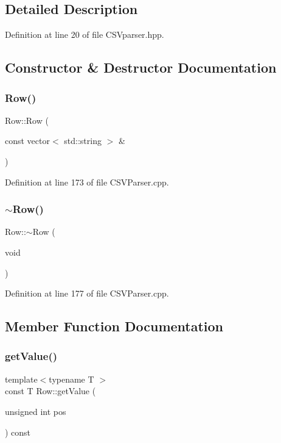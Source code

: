\subsection{Detailed Description}


Definition at line 20 of file C\+S\+Vparser.\+hpp.



\subsection{Constructor \& Destructor Documentation}
\mbox{\label{class_row_a86c5a552052b35938a825ff0d0b66c70}} 
\subsubsection{Row()}
{\footnotesize\ttfamily Row\+::\+Row (\begin{DoxyParamCaption}\item[{const vector$<$ std\+::string $>$ \&}]{ }\end{DoxyParamCaption})}



Definition at line 173 of file C\+S\+V\+Parser.\+cpp.

\mbox{\label{class_row_a671be9f718722eccb2d3121f1579733e}} 
\subsubsection{$\sim$Row()}
{\footnotesize\ttfamily Row\+::$\sim$\+Row (\begin{DoxyParamCaption}\item[{void}]{ }\end{DoxyParamCaption})}



Definition at line 177 of file C\+S\+V\+Parser.\+cpp.



\subsection{Member Function Documentation}
\mbox{\label{class_row_a06931bff452df5a451da2268423bb6ea}} 
\subsubsection{getValue()}
{\footnotesize\ttfamily template$<$typename T $>$ \\
const T Row\+::get\+Value (\begin{DoxyParamCaption}\item[{unsigned int}]{pos }\end{DoxyParamCaption}) const\hspace{0.3cm}{\ttfamily [inline]}}



